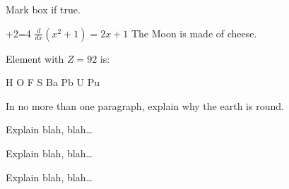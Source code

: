 \documentclass[12pt]{exam}
\begin{document}
\begin{questions}
{%
\checkboxchar{$\Box$} %
\question[3] Mark box if true.
\addpoints
\begin{checkboxes}
+2=4
\choice $\frac{d}{dx} (x^2+1) = 2x+1$
\choice The Moon is made of cheese.
\end{checkboxes}
}%

{%
\renewcommand*\thechoice{\arabic{choice}} 
\renewcommand*\choicelabel{\thechoice)}
%
\question[2] Element with $Z=92$ is:
\begin{multicols}{2}
\begin{choices}
\choice H
\choice O
\choice F
\choice S
\choice Ba
\choice Pb
\choice U
\choice Pu
\end{choices}
\end{multicols}
}%

\question[10]
In no more than one paragraph, explain why the earth is round.
\makeemptybox{2in}

\question[20]
Explain blah, blah\ldots
\makeemptybox{\fill}

\question[20]
Explain blah, blah\ldots
\fillwithlines{\fill}

\question[20]
Explain blah, blah\ldots
\fillwithdottedlines{8em}

\end{questions}
\end{document}
